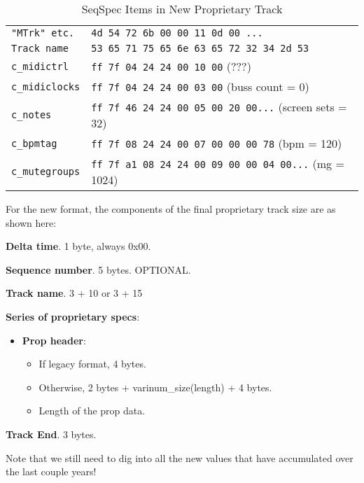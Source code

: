    \begin{table}[htb]
      \centering
      \caption{SeqSpec Items in New Proprietary Track}
      \label{table:seqspec_items_new_track}
      \begin{tabular}{l l}
\texttt{"MTrk" etc.}   & \texttt{4d 54 72 6b 00 00 11 0d 00 ...} \\
\texttt{Track name}    & \texttt{53 65 71 75 65 6e 63 65 72 32 34 2d 53} \\
\texttt{c\_midictrl}   & \texttt{ff 7f 04 24 24 00 10 00} (???) \\
\texttt{c\_midiclocks} & \texttt{ff 7f 04 24 24 00 03 00} (buss count = 0) \\
\texttt{c\_notes}      & \texttt{ff 7f 46 24 24 00 05 00 20 00...} (screen sets = 32) \\
\texttt{c\_bpmtag}     & \texttt{ff 7f 08 24 24 00 07 00 00 00 78} (bpm = 120) \\
\texttt{c\_mutegroups} & \texttt{ff 7f a1 08 24 24 00 09 00 00 04 00...} (mg = 1024) \\
      \end{tabular}
   \end{table}

   For the new format, the components of the final proprietary track size are
   as shown here:

   \begin{enumber}
      \item \textbf{Delta time}.  1 byte, always 0x00.
      \item \textbf{Sequence number}.  5 bytes.  OPTIONAL.
      \item \textbf{Track name}. 3 + 10 or 3 + 15
      \item \textbf{Series of proprietary specs}:
      \begin{itemize}
         \item \textbf{Prop header}:
         \begin{itemize}
            \item If legacy format, 4 bytes.
            \item Otherwise, 2 bytes + varinum\_size(length) + 4 bytes.
            \item Length of the prop data.
         \end{itemize}
      \end{itemize}
      \item \textbf{Track End}. 3 bytes.
   \end{enumber}

   Note that we still need to dig into all the new values that have accumulated
   over the last couple years!

